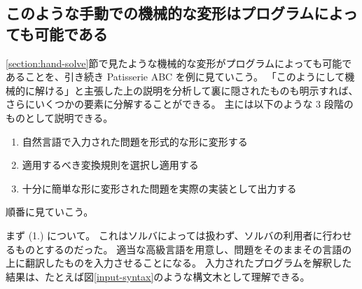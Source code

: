 \documentclass{ltjsarticle}
\begin{document}
\subsection{このような手動での機械的な変形はプログラムによっても可能である}\label{section:machine-solve}

\ref{section:hand-solve}節で見たような機械的な変形がプログラムによっても可能であることを、引き続き Patisserie ABC を例に見ていこう。
「このようにして機械的に解ける」と主張した上の説明を分析して裏に隠されたものも明示すれば、さらにいくつかの要素に分解することができる。
主には以下のような $3$ 段階のものとして説明できる。

\begin{enumerate}[label=(\arabic{enumi}.)]
    \item 自然言語で入力された問題を形式的な形に変形する
    \item 適用するべき変換規則を選択し適用する
    \item 十分に簡単な形に変形された問題を実際の実装として出力する
\end{enumerate}

順番に見ていこう。

まず (1.) について。
これはソルバによっては扱わず、ソルバの利用者に行わせるものとするのだった。
適当な高級言語を用意し、問題をそのままその言語の上に翻訳したものを入力させることになる。
入力されたプログラムを解釈した結果は、たとえば図\ref{input-syntax}のような構文木として理解できる。
\end{document}
